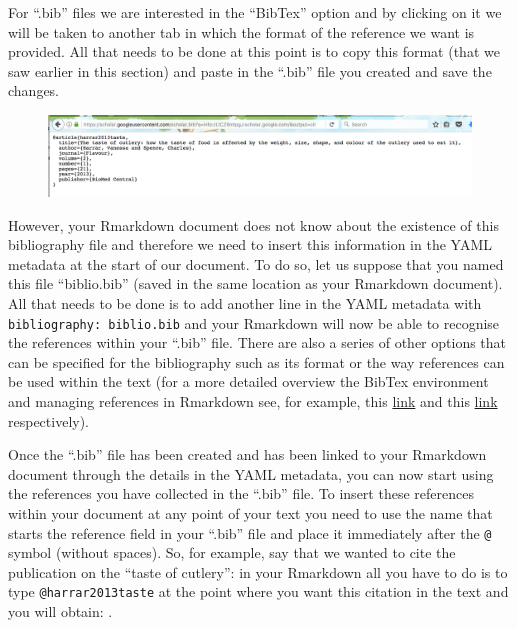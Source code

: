 \documentclass[]{book}
\theoremstyle{definition}
\theoremstyle{definition}
\theoremstyle{remark}
\begin{document}
For ``.bib'' files we are interested in the ``BibTex'' option and by
clicking on it we will be taken to another tab in which the format of
the reference we want is provided. All that needs to be done at this
point is to copy this format (that we saw earlier in this section) and
paste in the ``.bib'' file you created and save the changes.

\begin{figure}[htbp]
\centering
\includegraphics{images/googlescholar3.png}
\caption{}
\end{figure}

However, your Rmarkdown document does not know about the existence of
this bibliography file and therefore we need to insert this information
in the YAML metadata at the start of our document. To do so, let us
suppose that you named this file ``biblio.bib'' (saved in the same
location as your Rmarkdown document). All that needs to be done is to
add another line in the YAML metadata with
\texttt{bibliography:\ biblio.bib} and your Rmarkdown will now be able
to recognise the references within your ``.bib'' file. There are also a
series of other options that can be specified for the bibliography such
as its format or the way references can be used within the text (for a
more detailed overview the BibTex environment and managing references in
Rmarkdown see, for example, this
\href{https://www.economics.utoronto.ca/osborne/latex/BIBTEX.HTM}{link}
and this
\href{http://rmarkdown.rstudio.com/authoring_bibliographies_and_citations.html}{link}
respectively).

Once the ``.bib'' file has been created and has been linked to your
Rmarkdown document through the details in the YAML metadata, you can now
start using the references you have collected in the ``.bib'' file. To
insert these references within your document at any point of your text
you need to use the name that starts the reference field in your
``.bib'' file and place it immediately after the \texttt{@} symbol
(without spaces). So, for example, say that we wanted to cite the
publication on the ``taste of cutlery'': in your Rmarkdown all you have
to do is to type \texttt{@harrar2013taste} at the point where you want
this citation in the text and you will obtain: \citet{harrar2013taste}.
\end{document}
